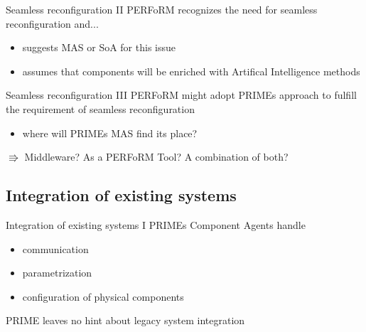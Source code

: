 \documentclass[12pt, xcolor=dvipsnames]{beamer}
\begin{document}
\begin{frame}{Seamless reconfiguration II}
	PERFoRM recognizes the need for seamless reconfiguration and...
	\newline 
	
	\begin{itemize}
		\item suggests MAS or SoA for this issue
		\newline
		
		\item assumes that components will be enriched with Artifical Intelligence methods
		\newline
	\end{itemize}
\end{frame}

\begin{frame}{Seamless reconfiguration III}
	PERFoRM might adopt PRIMEs approach to fulfill the requirement of seamless reconfiguration
	\newline
		
	\begin{itemize}
		\item where will PRIMEs MAS find its place?
		\newline
			
	\end{itemize}
	$\Rrightarrow$ Middleware? As a PERFoRM Tool? A combination of both?
\end{frame}

\subsection{Integration of existing systems}

\begin{frame}{Integration of existing systems I}
	PRIMEs Component Agents handle
	\newline
	
	\begin{itemize}
		\item communication
		\newline
		
		\item parametrization
		\newline
		
		\item configuration of physical components
		\newline
		
	\end{itemize}
	
	PRIME leaves no hint about legacy system integration
\end{frame}
\end{document}
